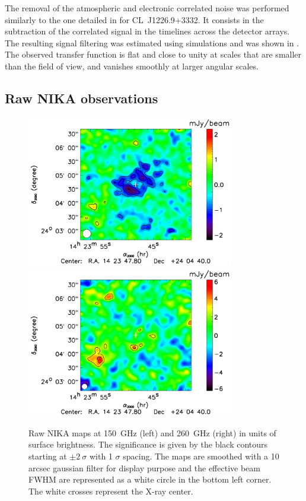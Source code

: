 \documentclass[twocolumn,traditabstract]{aa}
\begin{document}
The removal of the atmospheric and electronic correlated noise was performed similarly to the one detailed in \cite{adam2014} for \mbox{CL~J1226.9+3332}. It consists in the subtraction of the correlated signal in the timelines across the detector arrays. The resulting signal filtering was estimated using simulations and was shown in \cite{adam2014}. The observed transfer function is flat and close to unity at scales that are smaller than the field of view, and vanishes smoothly at larger angular scales.

\subsection{Raw NIKA observations}\label{sec:Raw_NIKA_observations}
\begin{figure}[h]
\centering
\includegraphics[height=6.6cm]{Figure/MACSJ1424_2mm_map.pdf}
\includegraphics[height=6.6cm]{Figure/MACSJ1424_1mm_map.pdf}
\caption{Raw NIKA maps at 150~GHz (left) and 260~GHz (right) in units of surface brightness. The significance is given by the black contours starting at $\pm 2 \ \sigma$ with 1 $\sigma$ spacing. The maps are smoothed with a 10 arcsec gaussian filter for display purpose and the effective beam FWHM are represented as a white circle in the bottom left corner. The white crosses represent the X-ray center.}
\label{fig:flux_map}
\end{figure}
\end{document}
